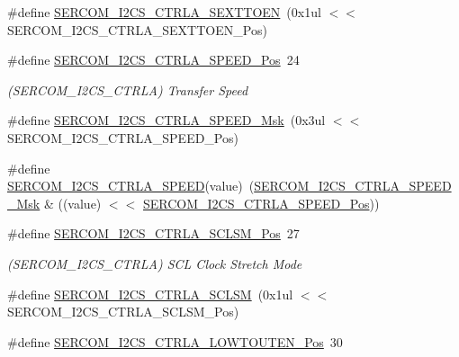 \begin{DoxyCompactItemize}
\#define \mbox{\hyperlink{group___s_a_m_d21___s_e_r_c_o_m_ga86263d9b30983ef7a42cbd2bd7506e83}{S\+E\+R\+C\+O\+M\+\_\+\+I2\+C\+S\+\_\+\+C\+T\+R\+L\+A\+\_\+\+S\+E\+X\+T\+T\+O\+EN}}~(0x1ul $<$$<$ S\+E\+R\+C\+O\+M\+\_\+\+I2\+C\+S\+\_\+\+C\+T\+R\+L\+A\+\_\+\+S\+E\+X\+T\+T\+O\+E\+N\+\_\+\+Pos)
\item 
\#define \mbox{\hyperlink{group___s_a_m_d21___s_e_r_c_o_m_ga03856ff2f8e5c875ba1cb347bc6e4bfe}{S\+E\+R\+C\+O\+M\+\_\+\+I2\+C\+S\+\_\+\+C\+T\+R\+L\+A\+\_\+\+S\+P\+E\+E\+D\+\_\+\+Pos}}~24
\begin{DoxyCompactList}\small\item\em (S\+E\+R\+C\+O\+M\+\_\+\+I2\+C\+S\+\_\+\+C\+T\+R\+LA) Transfer Speed \end{DoxyCompactList}\item 
\#define \mbox{\hyperlink{group___s_a_m_d21___s_e_r_c_o_m_ga30a6a7bfa7b97d02181ad7d0898a8ae3}{S\+E\+R\+C\+O\+M\+\_\+\+I2\+C\+S\+\_\+\+C\+T\+R\+L\+A\+\_\+\+S\+P\+E\+E\+D\+\_\+\+Msk}}~(0x3ul $<$$<$ S\+E\+R\+C\+O\+M\+\_\+\+I2\+C\+S\+\_\+\+C\+T\+R\+L\+A\+\_\+\+S\+P\+E\+E\+D\+\_\+\+Pos)
\item 
\#define \mbox{\hyperlink{group___s_a_m_d21___s_e_r_c_o_m_gae0687f5918d7ba52ca48c44e52ff12fd}{S\+E\+R\+C\+O\+M\+\_\+\+I2\+C\+S\+\_\+\+C\+T\+R\+L\+A\+\_\+\+S\+P\+E\+ED}}(value)~(\mbox{\hyperlink{group___s_a_m_d21___s_e_r_c_o_m_ga30a6a7bfa7b97d02181ad7d0898a8ae3}{S\+E\+R\+C\+O\+M\+\_\+\+I2\+C\+S\+\_\+\+C\+T\+R\+L\+A\+\_\+\+S\+P\+E\+E\+D\+\_\+\+Msk}} \& ((value) $<$$<$ \mbox{\hyperlink{group___s_a_m_d21___s_e_r_c_o_m_ga03856ff2f8e5c875ba1cb347bc6e4bfe}{S\+E\+R\+C\+O\+M\+\_\+\+I2\+C\+S\+\_\+\+C\+T\+R\+L\+A\+\_\+\+S\+P\+E\+E\+D\+\_\+\+Pos}}))
\item 
\#define \mbox{\hyperlink{group___s_a_m_d21___s_e_r_c_o_m_gaa359fcba2a29b5be482f94a01023579e}{S\+E\+R\+C\+O\+M\+\_\+\+I2\+C\+S\+\_\+\+C\+T\+R\+L\+A\+\_\+\+S\+C\+L\+S\+M\+\_\+\+Pos}}~27
\begin{DoxyCompactList}\small\item\em (S\+E\+R\+C\+O\+M\+\_\+\+I2\+C\+S\+\_\+\+C\+T\+R\+LA) S\+CL Clock Stretch Mode \end{DoxyCompactList}\item 
\#define \mbox{\hyperlink{group___s_a_m_d21___s_e_r_c_o_m_ga026eef82801f2a35002009d7fb286155}{S\+E\+R\+C\+O\+M\+\_\+\+I2\+C\+S\+\_\+\+C\+T\+R\+L\+A\+\_\+\+S\+C\+L\+SM}}~(0x1ul $<$$<$ S\+E\+R\+C\+O\+M\+\_\+\+I2\+C\+S\+\_\+\+C\+T\+R\+L\+A\+\_\+\+S\+C\+L\+S\+M\+\_\+\+Pos)
\item 
\#define \mbox{\hyperlink{group___s_a_m_d21___s_e_r_c_o_m_ga6fa50264b4e64fc2f54c940486b205a8}{S\+E\+R\+C\+O\+M\+\_\+\+I2\+C\+S\+\_\+\+C\+T\+R\+L\+A\+\_\+\+L\+O\+W\+T\+O\+U\+T\+E\+N\+\_\+\+Pos}}~30

\end{DoxyCompactItemize}
